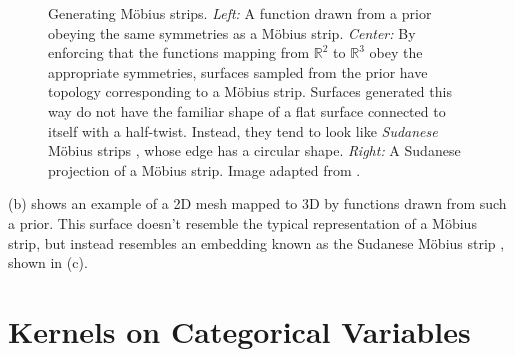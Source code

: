 \begin{figure}
\begin{tabular}[t]{ccc}
\end{tabular}
\caption[Generating M\"{o}bius strips]{Generating M\"{o}bius strips.
\emph{Left:} A function drawn from a \sgp{} prior obeying the same symmetries as a M\"{o}bius strip.
\emph{Center:} By enforcing that the functions mapping from $\mathbb{R}^2$ to $\mathbb{R}^3$ obey the appropriate symmetries, surfaces sampled from the prior have topology corresponding to a M\"{o}bius strip.
Surfaces generated this way do not have the familiar shape of a flat surface connected to itself with a half-twist.
Instead, they tend to look like \emph{Sudanese} M\"{o}bius strips \citep{sudanese1984}, whose edge has a circular shape.
\emph{Right:} A Sudanese projection of a M\"{o}bius strip.
Image adapted from \citep{sudanesepict}.
}
\label{fig:mobius}
\end{figure}

(b) shows an example of a 2D mesh mapped to 3D by functions drawn from such a prior.
This surface doesn't resemble the typical representation of a M\"{o}bius strip,
but instead resembles an embedding known as the Sudanese M\"{o}bius strip \citep{sudanese1984}, shown in (c).




\section{Kernels on Categorical Variables}



